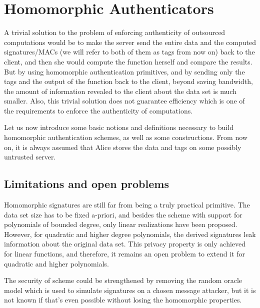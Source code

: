 \chapter{Homomorphic Authenticators}\label{chap:homo-auth}

A trivial solution to the problem of enforcing authenticity of outsourced
computations would be to make the server send the entire data and the computed
signatures/MACs (we will refer to both of them as tags from now on) back to the
client, and then she would compute the function herself and compare the
results. But by using homomorphic authentication primitives, and by sending
only the tags and the output of the function back to the client, beyond saving
bandwidth, the amount of information revealed to the client about the data set
is much smaller. Also, this trivial solution does not guarantee efficiency
which is one of the requirements to enforce the authenticity of computations.

Let us now introduce some basic notions and definitions necessary to build
homomorphic authentication schemes, as well as some constructions. From now on,
it is always assumed that Alice stores the data and tags on some possibly
untrusted server.




\section{Limitations and open problems}\label{sec:limitations}
Homomorphic signatures are still far from being a truly practical primitive.
The data set size has to be fixed a-priori, and besides the
 scheme with support for polynomials of bounded
degree, only linear realizations have been proposed. However, for quadratic and
higher degree polynomials, the derived signatures leak information about the
original data set. This privacy property is only achieved for linear functions,
and therefore, it remains an open problem to extend it for quadratic and higher
polynomials.

The security of  scheme could be strengthened by
removing the random oracle model which is used to simulate signatures on
a chosen message attacker, but it is not known if that's even possible without
losing the homomorphic properties.


